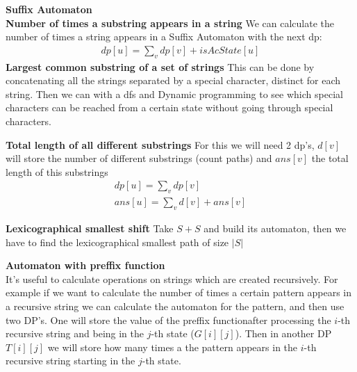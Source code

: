 \documentclass[12pt, twoside]{article}
\begin{document}
  \textbf{Suffix Automaton} \\
  \textbf{Number of times a substring appears in a string} We can calculate
  the number of times a string appears in a Suffix Automaton with the next dp:
  \begin{align*}
    dp[u] = \sum_{v}{dp[v]} + isAcState[u]
  \end{align*}
  \textbf{Largest common substring of a set of strings} This can be done by
  concatenating all the strings separated by a special character, distinct for
  each string. Then we can with a dfs and Dynamic programming to see which
  special characters can be reached from a certain state without going through
  special characters.

  \textbf{Total length of all different substrings} For this we will need 2
  dp's, $d[v]$ will store the number of different substrings (count paths) and
  $ans[v]$ the total length of this substrings
  \begin{align*}
    dp[u] = \sum_{v} dp[v] \\
    ans[u] = \sum_{v} d[v] + ans[v]
  \end{align*}

  \textbf{Lexicographical smallest shift} Take $S + S$ and build its
  automaton, then we have to find the lexicographical smallest path of size
  $|S|$

  \textbf{Automaton with preffix function}\\
  It's useful to calculate operations on strings which are created
  recursively. For example if we want to calculate the number of times a
  certain pattern appears in a recursive string we can calculate the automaton
  for the pattern, and then use two DP's. One will store the value of the
  preffix functionafter processing the $i$-th recursive string and being in
  the $j$-th state ($G[i][j]$). Then in another DP $T[i][j]$ we will store how
  many times a the pattern appears in the $i$-th recursive string starting in
  the $j$-th state.
\end{document}
